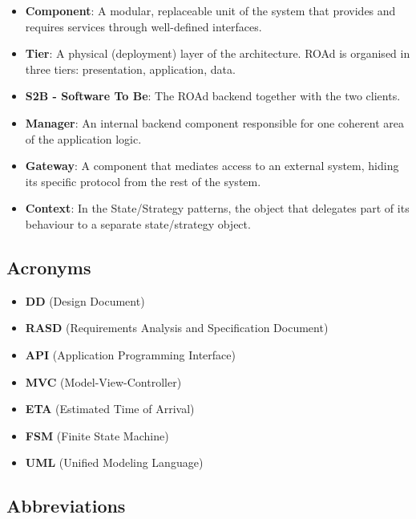 \documentclass[11pt,a4paper,oneside]{report}
\providecommand{\tightlist}{\setlength{\itemsep}{0pt}\setlength{\parskip}{0pt}}
\begin{document}
\begin{itemize}
\tightlist
\item
  \textbf{Component}: A modular, replaceable unit of the system that
  provides and requires services through well-defined interfaces.
\item
  \textbf{Tier}: A physical (deployment) layer of the architecture. ROAd
  is organised in three tiers: presentation, application, data.
\item
  \textbf{S2B - Software To Be}: The ROAd backend together with the
  two clients.
\item
  \textbf{Manager}: An internal backend component responsible for one
  coherent area of the application logic.
\item
  \textbf{Gateway}: A component that mediates access to an external
  system, hiding its specific protocol from the rest of the system.
\item
  \textbf{Context}: In the State/Strategy patterns, the object that
  delegates part of its behaviour to a separate state/strategy object.
\end{itemize}

\hypertarget{acronyms}{%
\subsection*{Acronyms}\label{acronyms}}

\begin{itemize}
\tightlist
\item
  \textbf{DD} (Design Document)
\item
  \textbf{RASD} (Requirements Analysis and Specification Document)
\item
  \textbf{API} (Application Programming Interface)
\item
  \textbf{MVC} (Model-View-Controller)
\item
  \textbf{ETA} (Estimated Time of Arrival)
\item
  \textbf{FSM} (Finite State Machine)
\item
  \textbf{UML} (Unified Modeling Language)
\end{itemize}

\hypertarget{abbreviations}{%
\subsection*{Abbreviations}\label{abbreviations}}
\end{document}

